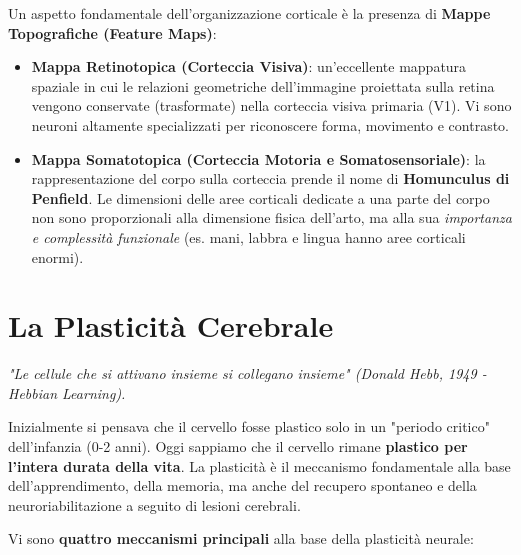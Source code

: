 Un aspetto fondamentale dell'organizzazione corticale è la presenza di \textbf{Mappe Topografiche (Feature Maps)}:
\begin{itemize}
    \item \textbf{Mappa Retinotopica (Corteccia Visiva)}: un'eccellente mappatura spaziale in cui le relazioni geometriche dell'immagine proiettata sulla retina vengono conservate (trasformate) nella corteccia visiva primaria (V1). Vi sono neuroni altamente specializzati per riconoscere forma, movimento e contrasto.
    \item \textbf{Mappa Somatotopica (Corteccia Motoria e Somatosensoriale)}: la rappresentazione del corpo sulla corteccia prende il nome di \textbf{Homunculus di Penfield}. Le dimensioni delle aree corticali dedicate a una parte del corpo non sono proporzionali alla dimensione fisica dell'arto, ma alla sua \textit{importanza e complessità funzionale} (es. mani, labbra e lingua hanno aree corticali enormi).
\end{itemize}

\section{La Plasticità Cerebrale}
\textit{"Le cellule che si attivano insieme si collegano insieme" (Donald Hebb, 1949 - Hebbian Learning).}

Inizialmente si pensava che il cervello fosse plastico solo in un "periodo critico" dell'infanzia (0-2 anni). Oggi sappiamo che il cervello rimane \textbf{plastico per l'intera durata della vita}. La plasticità è il meccanismo fondamentale alla base dell'apprendimento, della memoria, ma anche del recupero spontaneo e della neuroriabilitazione a seguito di lesioni cerebrali.

Vi sono \textbf{quattro meccanismi principali} alla base della plasticità neurale:


